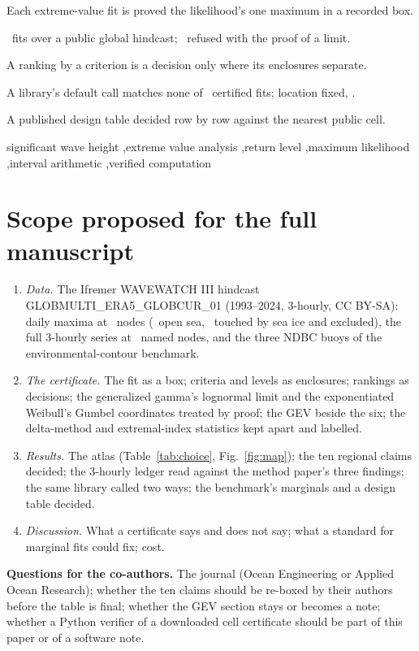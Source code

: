 \documentclass[preprint,10pt,authoryear]{elsarticle}
\begin{document}
\begin{frontmatter}
\begin{highlights}
\item Each extreme-value fit is proved the likelihood's one maximum in a recorded box.
\item \AFits\ fits over a public global hindcast; \AGGLimit\ refused with the proof of a limit.
\item A ranking by a criterion is a decision only where its enclosures separate.
\item A library's default call matches none of \SFits\ certified fits; location fixed, \SFixedAgree.
\item A published design table decided row by row against the nearest public cell.
\end{highlights}

\begin{keyword}
significant wave height \sep extreme value analysis \sep return level \sep maximum likelihood \sep interval arithmetic \sep verified computation
\end{keyword}

\end{frontmatter}

\section*{Scope proposed for the full manuscript}
\begin{enumerate}
\item \emph{Data.} The Ifremer WAVEWATCH III hindcast GLOBMULTI\_ERA5\_GLOBCUR\_01 (1993--2024, 3-hourly, CC BY-SA): daily maxima at \ANodes\ nodes (\ACells\ open sea, \AIce\ touched by sea ice and excluded), the full 3-hourly series at \RNodes\ named nodes, and the three NDBC buoys of the environmental-contour benchmark.
\item \emph{The certificate.} The fit as a box; criteria and levels as enclosures; rankings as decisions; the generalized gamma's lognormal limit and the exponentiated Weibull's Gumbel coordinates treated by proof; the GEV beside the six; the delta-method and extremal-index statistics kept apart and labelled.
\item \emph{Results.} The atlas (Table~\ref{tab:choice}, Fig.~\ref{fig:map}); the ten regional claims decided; the 3-hourly ledger read against the method paper's three findings; the same library called two ways; the benchmark's marginals and a design table decided.
\item \emph{Discussion.} What a certificate says and does not say; what a standard for marginal fits could fix; cost.
\end{enumerate}
\textbf{Questions for the co-authors.} The journal (Ocean Engineering or Applied Ocean Research); whether the ten claims should be re-boxed by their authors before the table is final; whether the GEV section stays or becomes a note; whether a Python verifier of a downloaded cell certificate should be part of this paper or of a software note.
\end{document}
